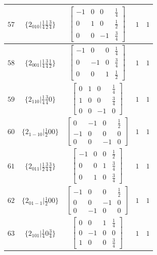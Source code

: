 \documentclass[fleqn,8pt]{jsarticle}
\begin{document}
\begin{longtable}{ccccc}
$ 57 $ & $ \{2{}_{010}|\frac{1}{4} \frac{1}{2} \frac{3}{4}\} $ & $ \begin{bmatrix} -1 & 0 & 0 & \frac{1}{4} \\ 0 & 1 & 0 & \frac{1}{2} \\ 0 & 0 & -1 & \frac{3}{4} \end{bmatrix} $ & $ 1 $ & $ 1 $ \\ \hline
$ 58 $ & $ \{2{}_{001}|\frac{1}{4} \frac{3}{4} \frac{1}{2}\} $ & $ \begin{bmatrix} -1 & 0 & 0 & \frac{1}{4} \\ 0 & -1 & 0 & \frac{3}{4} \\ 0 & 0 & 1 & \frac{1}{2} \end{bmatrix} $ & $ 1 $ & $ 1 $ \\ \hline
$ 59 $ & $ \{2{}_{110}|\frac{1}{4} \frac{3}{4} 0\} $ & $ \begin{bmatrix} 0 & 1 & 0 & \frac{1}{4} \\ 1 & 0 & 0 & \frac{3}{4} \\ 0 & 0 & -1 & 0 \end{bmatrix} $ & $ 1 $ & $ 1 $ \\ \hline
$ 60 $ & $ \{2{}_{1-10}|\frac{1}{2} 0 0\} $ & $ \begin{bmatrix} 0 & -1 & 0 & \frac{1}{2} \\ -1 & 0 & 0 & 0 \\ 0 & 0 & -1 & 0 \end{bmatrix} $ & $ 1 $ & $ 1 $ \\ \hline
$ 61 $ & $ \{2{}_{011}|\frac{1}{2} \frac{3}{4} \frac{3}{4}\} $ & $ \begin{bmatrix} -1 & 0 & 0 & \frac{1}{2} \\ 0 & 0 & 1 & \frac{3}{4} \\ 0 & 1 & 0 & \frac{3}{4} \end{bmatrix} $ & $ 1 $ & $ 1 $ \\ \hline
$ 62 $ & $ \{2{}_{01-1}|\frac{1}{2} 0 0\} $ & $ \begin{bmatrix} -1 & 0 & 0 & \frac{1}{2} \\ 0 & 0 & -1 & 0 \\ 0 & -1 & 0 & 0 \end{bmatrix} $ & $ 1 $ & $ 1 $ \\ \hline
$ 63 $ & $ \{2{}_{101}|\frac{1}{4} 0 \frac{3}{4}\} $ & $ \begin{bmatrix} 0 & 0 & 1 & \frac{1}{4} \\ 0 & -1 & 0 & 0 \\ 1 & 0 & 0 & \frac{3}{4} \end{bmatrix} $ & $ 1 $ & $ 1 $ \\ \hline

\end{longtable}
\end{document}
